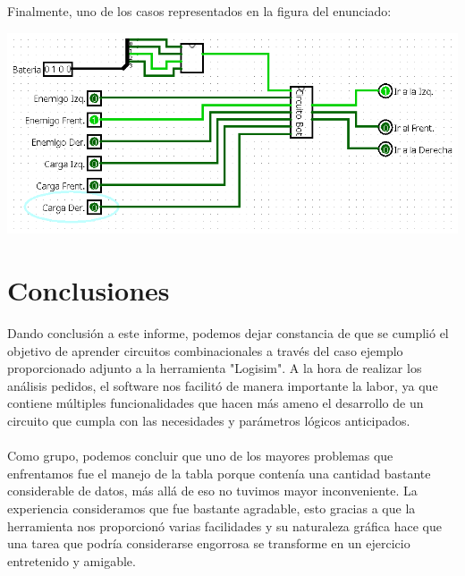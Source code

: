 \documentclass[a4paper]{article}
\begin{document}
Finalmente, uno de los casos representados en la figura del enunciado:
\begin{center}
    \includegraphics[width=1\textwidth]{tarea-1-ej-9.png} %
\end{center}

\section{Conclusiones}
Dando conclusión a este informe, podemos dejar constancia de que se cumplió el objetivo de aprender circuitos combinacionales a través del caso ejemplo proporcionado adjunto a la herramienta "Logisim". A la hora de realizar los análisis pedidos, el software nos facilitó de manera importante la labor, ya que contiene múltiples funcionalidades que hacen más ameno el desarrollo de un circuito que cumpla con las necesidades y parámetros lógicos anticipados.
\\\\
Como grupo, podemos concluir que uno de los mayores problemas que enfrentamos fue el manejo de la tabla porque contenía una cantidad bastante considerable de datos, más allá de eso no tuvimos mayor inconveniente. La experiencia consideramos que fue bastante agradable, esto gracias a que la herramienta nos proporcionó varias facilidades y su naturaleza gráfica hace que una tarea que podría considerarse engorrosa se transforme en un ejercicio entretenido y amigable.
\end{document}
